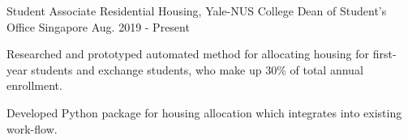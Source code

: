 

\begin{cventries}

  \cventry
  {Student Associate}
  {Residential Housing, Yale-NUS College Dean of Student's Office}
  {Singapore}
  {Aug. 2019 - Present}
  {
    \begin{cvitems}
    \item {Researched and prototyped automated method for allocating housing for
        first-year students and exchange students, who make up 30\% of total
        annual enrollment.}
    \item {Developed Python package for housing allocation which integrates into
        existing work-flow.}
    \end{cvitems}
  }
\end{cventries}
